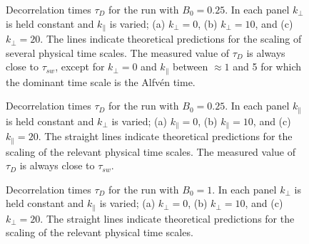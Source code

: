 \documentclass[aip,pop,reprint,amsmath,amssymb,floatfix]{revtex4-1}
\begin{document}
\begin{figure}
  \centering


  \caption{Decorrelation times $\tau_D$ for the run with 
    $B_0=0.25$. In each panel $k_\perp$ is held constant and $k_\parallel$
    is varied; (a) $k_\perp = 0$, (b) $k_\perp = 10$, and (c) $k_\perp =
    20$. The lines indicate theoretical predictions for the scaling of
    several physical time scales. The measured value of $\tau_D$ is always
    close to $\tau_{sw}$, except for $k_\perp = 0$ and $k_\parallel$
    between $\approx 1$ and 5 for which the dominant time scale is the
    Alfv\'en time.}
  \label{fig5:B025_bvf_b_kperp}
\end{figure}

\begin{figure}
  \centering


  \caption{Decorrelation times $\tau_D$ for the run with
    $B_0=0.25$. In each panel $k_\parallel$ is held constant and
    $k_\perp$ is varied; (a) $k_\parallel = 0$, (b) $k_\parallel =
    10$, and (c) $k_\parallel = 20$. The straight lines indicate 
    theoretical predictions for the scaling of the relevant physical time
    scales. The measured value of $\tau_D$ is always close to
    $\tau_{sw}$.}
  \label{fig5:B025_bvf_b_kpara}
\end{figure}

\begin{figure}
  \centering


  \caption{Decorrelation times $\tau_D$ for the run with $B_0=1$. In each
    panel $k_\perp$ is held constant and $k_\parallel$ is varied; (a)
    $k_\perp=0$, (b) $k_\perp = 10$, and (c) $k_\perp = 20$. The
    straight lines indicate theoretical predictions for
    the scaling of the relevant physical time scales.}
  \label{fig5:B1_bvf_b_kperp}
\end{figure}
\end{document}
